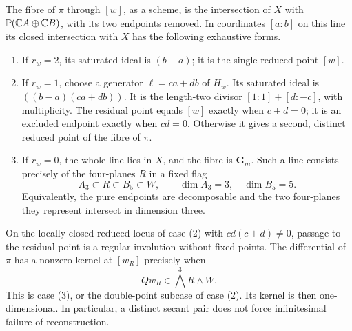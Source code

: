 \begin{theorem}
\label{thm:exceptional-component-fibres}
The fibre of \(\pi\) through \([w]\), as a scheme, is the
intersection of \(X\) with \(\mathbb P(\mathbb C A\oplus\mathbb C B)\), with
its two endpoints removed.  In coordinates \([a:b]\) on this line
its closed intersection with \(X\) has the following exhaustive forms.
\begin{enumerate}
\item If \(r_w=2\), its saturated ideal is \((b-a)\); it is the
single reduced point \([w]\).
\item If \(r_w=1\), choose a generator
\(\ell=ca+db\) of \(H_w\).  Its saturated ideal is
\(((b-a)(ca+db))\).  It is the length-two divisor
\([1:1]+[d:-c]\), with multiplicity.  The residual point equals
\([w]\) exactly when \(c+d=0\); it is an excluded endpoint exactly
when \(cd=0\).  Otherwise it gives a second, distinct reduced point
of the fibre of \(\pi\).
\item If \(r_w=0\), the whole line lies in \(X\), and the fibre
is \(\mathbf G_m\).  Such a line consists precisely of the
four-planes \(R\) in a fixed flag
\[
 A_3\subset R\subset B_5\subset W,\qquad
          \dim A_3=3,\quad\dim B_5=5.
\]
Equivalently, the pure endpoints are decomposable and the two
four-planes they represent intersect in dimension three.
\end{enumerate}
On the locally closed reduced locus of case (2) with
\(cd(c+d)\ne0\), passage to the residual point is a regular
involution without fixed points.  The differential of \(\pi\) has a
nonzero kernel at \([w_R]\) precisely when
\begin{equation}\label{eq:exceptional-tangent-criterion}
 Qw_R\in \bigwedge^3R\wedge W.
\end{equation}
This is case (3), or the double-point subcase of case (2).
Its kernel is then one-dimensional.  In particular, a distinct
secant pair does not force infinitesimal failure of reconstruction.
\end{theorem}
